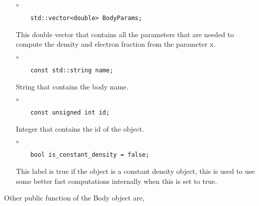 \begin{itemize}
\item[$\circ$]  
  \begin{lstlisting}
    std::vector<double> BodyParams;
  \end{lstlisting}
  This double vector that contains all the parameters that are
  needed to compute the density and electron fraction from the parameter
  {\ttf x}.
  
\item[$\circ$]
  \begin{lstlisting}
    const std::string name;
  \end{lstlisting}
  String that contains the body name.

\item[$\circ$]  
  \begin{lstlisting}
    const unsigned int id;
  \end{lstlisting}
  Integer that contains the id of the object.

\item[$\circ$]  
  \begin{lstlisting}
    bool is_constant_density = false;
  \end{lstlisting}  
  This label is true if the object is a constant density object, this is
  used to use some better fast computations internally when this is set to true.
\end{itemize}

Other public function of the {\ttf Body} object are,

